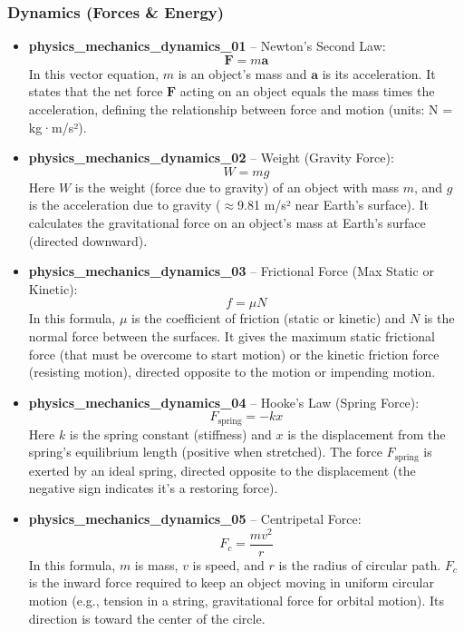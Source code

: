 \documentclass[11pt,a4paper]{article}
\begin{document}
\subsubsection{Dynamics (Forces \& Energy)}

\begin{itemize}
\item \textbf{physics\_mechanics\_dynamics\_01} -- Newton's Second Law: 
\[\mathbf{F} = m\mathbf{a}\]
In this vector equation, $m$ is an object's mass and $\mathbf{a}$ is its acceleration. It states that the net force $\mathbf{F}$ acting on an object equals the mass times the acceleration, defining the relationship between force and motion (units: N = kg·m/s²).

\item \textbf{physics\_mechanics\_dynamics\_02} -- Weight (Gravity Force): 
\[W = mg\]
Here $W$ is the weight (force due to gravity) of an object with mass $m$, and $g$ is the acceleration due to gravity ($\approx$9.81 m/s² near Earth's surface). It calculates the gravitational force on an object's mass at Earth's surface (directed downward).

\item \textbf{physics\_mechanics\_dynamics\_03} -- Frictional Force (Max Static or Kinetic): 
\[f = \mu N\]
In this formula, $\mu$ is the coefficient of friction (static or kinetic) and $N$ is the normal force between the surfaces. It gives the maximum static frictional force (that must be overcome to start motion) or the kinetic friction force (resisting motion), directed opposite to the motion or impending motion.

\item \textbf{physics\_mechanics\_dynamics\_04} -- Hooke's Law (Spring Force): 
\[F_{\text{spring}} = -kx\]
Here $k$ is the spring constant (stiffness) and $x$ is the displacement from the spring's equilibrium length (positive when stretched). The force $F_{\text{spring}}$ is exerted by an ideal spring, directed opposite to the displacement (the negative sign indicates it's a restoring force).

\item \textbf{physics\_mechanics\_dynamics\_05} -- Centripetal Force: 
\[F_c = \frac{mv^2}{r}\]
In this formula, $m$ is mass, $v$ is speed, and $r$ is the radius of circular path. $F_c$ is the inward force required to keep an object moving in uniform circular motion (e.g., tension in a string, gravitational force for orbital motion). Its direction is toward the center of the circle.


\end{itemize}
\end{document}
